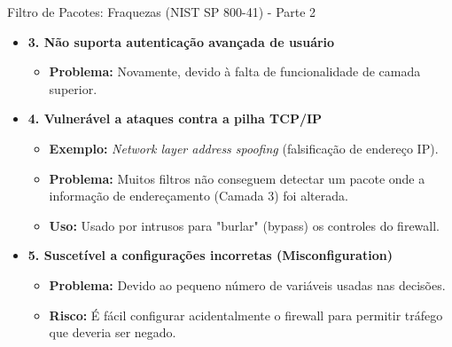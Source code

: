 \begin{frame}{Filtro de Pacotes: Fraquezas (NIST SP 800-41) - Parte 2}
    \begin{itemize}
        \item \textbf{3. Não suporta autenticação avançada de usuário}
              \begin{itemize}
                  \item \textbf{Problema:} Novamente, devido à falta de funcionalidade de camada superior.
              \end{itemize}

        \item \textbf{4. Vulnerável a ataques contra a pilha TCP/IP}
              \begin{itemize}
                  \item \textbf{Exemplo:} \textit{Network layer address spoofing} (falsificação de endereço IP).
                  \item \textbf{Problema:} Muitos filtros não conseguem detectar um pacote onde a informação de endereçamento (Camada 3) foi alterada.
                  \item \textbf{Uso:} Usado por intrusos para "burlar" (bypass) os controles do firewall.
              \end{itemize}

        \item \textbf{5. Suscetível a configurações incorretas (Misconfiguration)}
              \begin{itemize}
                  \item \textbf{Problema:} Devido ao pequeno número de variáveis usadas nas decisões.
                  \item \textbf{Risco:} É fácil configurar acidentalmente o firewall para permitir tráfego que deveria ser negado.
              \end{itemize}
    \end{itemize}
\end{frame}

